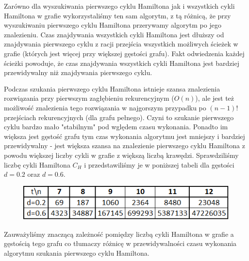 \documentclass{article}
\begin{document}
Zarówno dla wyszukiwania pierwszego cyklu Hamiltona jak i wszystkich cykli Hamiltona w grafie wykorzystaliśmy ten sam algorytm, z tą różnicą, że przy wyszukiwaniu pierwszego cyklu Hamiltona przerywamy algorytm po jego znalezieniu. Czas znajdywania wszystkich cykli Hamiltona jest dłuższy od znajdywania pierwszego cyklu z racji przejścia wszystkich możliwych ścieżek w grafie (których jest więcej przy większej gęstości grafu). Fakt odwiedzenia każdej ścieżki powoduje, że czas znajdywania wszystkich cykli Hamiltona jest bardziej przewidywalny niż znajdywania pierwszego cyklu.

Podczas szukania pierwszego cyklu Hamiltona istnieje szansa znalezienia rozwiązania przy pierwszym zagłębieniu rekurencyjnym ($O(n)$), ale jest też możliwość znalezienia tego rozwiązania w najgorszym przypadku po $(n-1)!$ przejściach rekurencyjnych (dla grafu pełnego). Czyni to szukanie pierwszego cyklu bardzo mało "stabilnym" pod wględem czasu wykonania. Ponadto im większa jest gęstość grafu tym czas wykonania algorytmu jest mniejszy i bardziej przewidywalny - jest większa szansa na znalezienie pierwszego cyklu Hamiltona z powodu większej liczby cykli w grafie z większą liczbą krawędzi. Sprawdziliśmy liczbę cykli Hamiltona $C_H$ i przedstawiliśmy je w poniższej tabeli dla gęstości $d=0.2$ oraz $d=0.6$.

\begin{figure}[h!]
\centering
\includegraphics[width=0.6\linewidth]{zad4_CYC.png}
\end{figure}%

Zauważyliśmy znaczącą zależność pomiędzy liczbą cykli Hamiltona w grafie a gęstością tego grafu co tłumaczy różnicę w przewidywalności czasu wykonania algorytmu szukania pierwszego cyklu Hamiltona.
\end{document}
